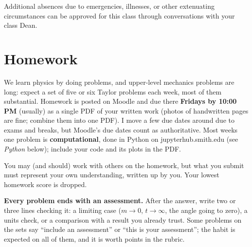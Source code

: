 \medskip
Additional absences due to emergencies, illnesses, or other extenuating
circumstances can be approved for this class through conversations with your
class Dean.

\bigskip

\section{Homework}
%
We learn physics by doing problems, and upper-level mechanics problems
are long: expect a set of five or six Taylor problems each week, most of
them substantial. Homework is posted on Moodle and due there
\textbf{Fridays by 10:00 PM} (usually) as a single PDF of your written work
(photos of handwritten pages are fine; combine them into one PDF). I move a few
due dates around due to exams and breaks, but Moodle's due dates count as authoritative.
Most weeks one problem is \textbf{computational}, done in
Python on jupyterhub.smith.edu (see \emph{Python} below); include your code
and its plots in the PDF.

\medskip
You may (and should) work with others on the homework, but what you
submit must represent your own understanding, written up by you. Your
lowest homework score is dropped.

\medskip
\textbf{Every problem ends with an assessment.} After the answer, write
two or three lines checking it: a limiting case ($m \to 0$, $t \to
\infty$, the angle going to zero), a units check, or a comparison with a
result you already trust. Some problems on the sets say ``include an
assessment'' or ``this is your assessment''; the habit is expected on all
of them, and it is worth points in the rubric.

